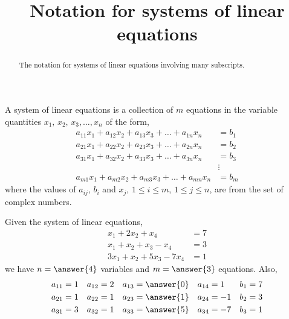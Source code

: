 \documentclass{ximera}
\title{Notation for systems of linear equations}
\begin{document}
\begin{abstract}
  The notation for systems of linear equations involving many subscripts.
\end{abstract}
\maketitle

\begin{definition}
  A system of linear equations is a collection of $m$ equations in the variable quantities $x_1,\,x_2,\,x_3,\ldots,x_n$ of the form,
  \begin{align*}
    a_{11}x_1+a_{12}x_2+a_{13}x_3+\dots+a_{1n}x_n&=b_1\\
    a_{21}x_1+a_{22}x_2+a_{23}x_3+\dots+a_{2n}x_n&=b_2\\
    a_{31}x_1+a_{32}x_2+a_{33}x_3+\dots+a_{3n}x_n&=b_3\\
                                                 &\vdots\\
    a_{m1}x_1+a_{m2}x_2+a_{m3}x_3+\dots+a_{mn}x_n&=b_m
  \end{align*}
  where the values of $a_{ij}$, $b_i$ and $x_j$, $1\leq i\leq m$, $1\leq j\leq n$, are from the set of complex numbers.
\end{definition}

\begin{example}
  Given the system of linear equations,
  \begin{align*}
    x_1+2x_2 + x_4&= 7\\
    x_1+x_2+x_3-x_4&=3\\
    3x_1+x_2+5x_3-7x_4&=1
  \end{align*}
  we have $n=\answer{4}$ variables and $m=\answer{3}$ equations.  Also,
  \begin{align*}
    a_{11}&=1 & a_{12}&=2 & a_{13}&=\answer{0} & a_{14}&=1 & b_{1}&=7\\
    a_{21}&=1 & a_{22}&=1 & a_{23}&=\answer{1} & a_{24}&=-1 & b_{2}&=3\\
    a_{31}&=3 & a_{32}&=1 & a_{33}&=\answer{5} & a_{34}&=-7 & b_{3}&=1
  \end{align*}
\end{example}
\end{document}

